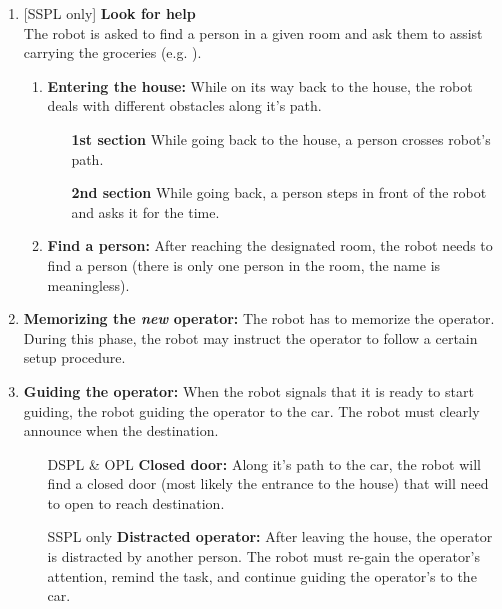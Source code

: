 \begin{enumerate}
  \setcounter{enumi}{\theenumTemp}
  \item {[SSPL only]} \textbf{Look for help} \\
  The robot is asked to find a person in a given room and ask them to assist carrying the groceries (e.g. ).
  \begin{enumerate}
    \item \textbf{Entering the house:} While on its way back to the house, the robot deals with different obstacles along it's path.
    \begin{itemize}[leftmargin=3cm]
      \item[\textbf{1st section}] While going back to the house, a person crosses robot's path.
      \item[\textbf{2nd section}] While going back, a person steps in front of the robot and asks it for the time.
    \end{itemize}

    \item \textbf{Find a person:} After reaching the designated room, the robot needs to find a person (there is only one person in the room, the name is meaningless).
  \end{enumerate}

  \item \textbf{Memorizing the \emph{new} operator:} The robot has to memorize the operator. During this phase, the robot may instruct the operator to follow a certain setup procedure.

  \item \textbf{Guiding the operator:} When the robot signals that it is ready to start guiding, the robot guiding the operator to the car. The robot must clearly announce when the destination.
  \begin{itemize}[leftmargin=3cm]
    \item[DSPL \& OPL] \textbf{Closed door:} Along it's path to the car, the robot will find a closed door (most likely the entrance to the house) that will need to open to reach destination.
    \item[SSPL only] \textbf{Distracted operator:} After leaving the house, the operator is distracted by another person. The robot must re-gain the operator's attention, remind the task, and continue guiding the operator's to the car.
  \end{itemize}

\end{enumerate}

